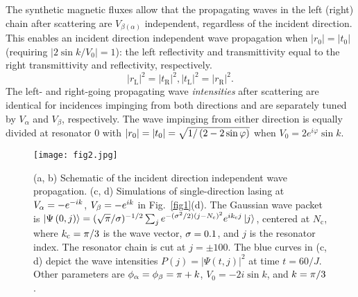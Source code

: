 \documentclass[prl,showpacs,superscriptaddress,twocolumn]{revtex4-1}
\begin{document}

The synthetic magnetic fluxes allow that the propagating waves in the left
(right) chain after scattering are $V_{\beta (\alpha )}$ independent,
regardless of the incident direction. This enables an incident direction
independent wave propagation when $\left\vert r_{0}\right\vert =\left\vert
t_{0}\right\vert $ (requiring $\left\vert 2\sin k/V_{0}\right\vert =1$): the
left reflectivity and transmittivity equal to the right transmittivity and
reflectivity, respectively.
\begin{equation}
\left\vert r_{\mathrm{L}}\right\vert ^2=\left\vert t_{\mathrm{R}}\right\vert
^2 ,\left\vert t_{\mathrm{L}}\right\vert ^2=\left\vert r_{\mathrm{R}%
}\right\vert ^2.
\end{equation}%
The left- and right-going propagating wave \emph{intensities} after
scattering are identical for incidences impinging from both directions and
are separately tuned by $V_{\alpha }$ and $V_{\beta }$, respectively. The
wave impinging from either direction is equally divided at resonator $0$
with $\left\vert r_{0}\right\vert =\left\vert t_{0}\right\vert =\sqrt{%
1/\left( 2-2\sin \varphi \right) }$ when $V_{0}=2e^{i\varphi }\sin k$.

\begin{figure}[t]
\centering
\texttt{[image: fig2.jpg]}
\caption{(a, b) Schematic of the incident direction independent wave propagation. (c, d)
Simulations of single-direction lasing at $V_{\protect\alpha }=-e^{-ik}$, $V_{\protect\beta }=-e^{ik}$ in Fig.~\ref{fig1}(d). The Gaussian wave packet is $\left\vert \Psi \left( 0,j\right) \right\rangle =(\protect\sqrt{\protect\pi }/\protect\sigma )^{-1/2}\sum_{j}e^{-(\protect\sigma ^{2}/2)\left( j-N_{\mathrm{c}}\right) ^{2}}e^{ik_{\mathrm{c}}j}\left\vert j\right\rangle $,
centered at $N_{\mathrm{c}}$, where $k_{\mathrm{c}}=\protect\pi /3$ is the
wave vector, $\protect\sigma =0.1$, and $j$
is the resonator index. The resonator chain is cut at $j=\pm 100$. The blue curves in (c, d) depict
the wave intensities $P\left( j\right) =|\Psi \left( t,j\right) |^{2}$ at
time $t=60/J$. Other parameters are $\protect\phi _{\protect\alpha }=\protect\phi _{\protect\beta }=\protect\pi +k$, $V_{0}=-2i\sin k$, and $k=\protect\pi /3$.}
\label{fig2}
\end{figure}
\end{document}
